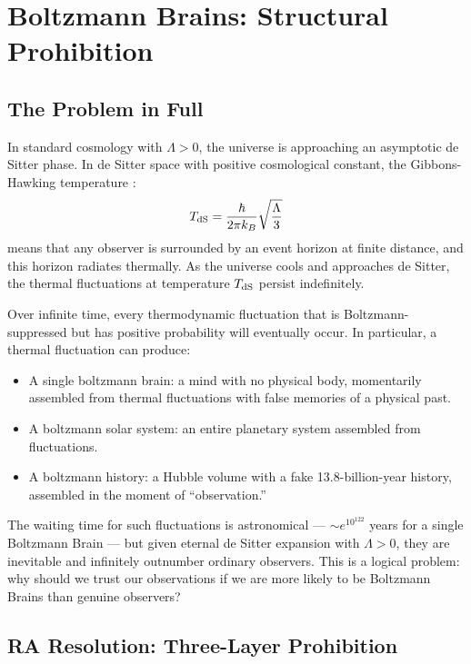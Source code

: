 \documentclass[12pt,a4paper]{article}
\begin{document}
\section{Boltzmann Brains: Structural Prohibition}\label{sec:bb}

\subsection{The Problem in Full}

In standard cosmology with $\Lambda>0$, the universe is approaching an asymptotic de Sitter phase.  In de Sitter space with positive cosmological constant, the Gibbons-Hawking temperature \cite{Gibbons1977}:
\begin{equation}
  T_{\rm dS} = \frac{\hbar}{2\pi k_B}\sqrt{\frac{\Lambda}{3}}
\end{equation}
means that any observer is surrounded by an event horizon at finite distance, and this horizon radiates thermally.  As the universe cools and approaches de Sitter, the thermal fluctuations at temperature $T_{\rm dS}$ persist indefinitely.

Over infinite time, every thermodynamic fluctuation that is Boltzmann-suppressed but has positive probability will eventually occur.  In particular, a thermal fluctuation can produce:
\begin{itemize}
  \item A single boltzmann brain: a mind with no physical body, momentarily assembled from thermal fluctuations with false memories of a physical past.
  \item A boltzmann solar system: an entire planetary system assembled from fluctuations.
  \item A boltzmann history: a Hubble volume with a fake 13.8-billion-year history, assembled in the moment of ``observation.''
\end{itemize}
The waiting time for such fluctuations is astronomical --- $\sim e^{10^{122}}$ years for a single Boltzmann Brain --- but given eternal de Sitter expansion with $\Lambda>0$, they are inevitable and infinitely outnumber ordinary observers.  This is a logical problem: why should we trust our observations if we are more likely to be Boltzmann Brains than genuine observers?

\subsection{RA Resolution: Three-Layer Prohibition}
\end{document}
